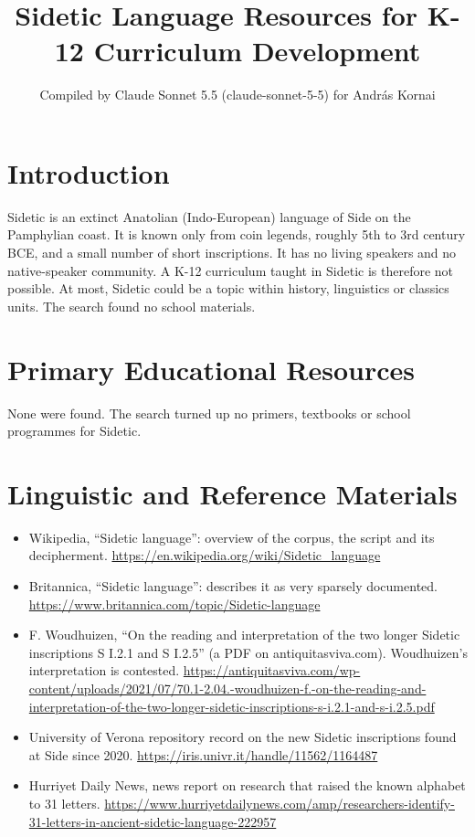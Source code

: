 \documentclass[12pt]{article}
\title{Sidetic Language Resources for K-12 Curriculum Development}
\author{Compiled by Claude Sonnet 5.5 (claude-sonnet-5-5) for Andr\'as Kornai}
\date{}
\begin{document}
\maketitle

\section{Introduction}
Sidetic is an extinct Anatolian (Indo-European) language of Side on the Pamphylian coast. It is known only from coin legends, roughly 5th to 3rd century BCE, and a small number of short inscriptions. It has no living speakers and no native-speaker community. A K-12 curriculum taught in Sidetic is therefore not possible. At most, Sidetic could be a topic within history, linguistics or classics units. The search found no school materials.

\section{Primary Educational Resources}
None were found. The search turned up no primers, textbooks or school programmes for Sidetic.

\section{Linguistic and Reference Materials}
\begin{itemize}
\item Wikipedia, ``Sidetic language'': overview of the corpus, the script and its decipherment. \url{https://en.wikipedia.org/wiki/Sidetic_language}
\item Britannica, ``Sidetic language'': describes it as very sparsely documented. \url{https://www.britannica.com/topic/Sidetic-language}
\item F. Woudhuizen, ``On the reading and interpretation of the two longer Sidetic inscriptions S I.2.1 and S I.2.5'' (a PDF on antiquitasviva.com). Woudhuizen's interpretation is contested. \url{https://antiquitasviva.com/wp-content/uploads/2021/07/70.1-2.04.-woudhuizen-f.-on-the-reading-and-interpretation-of-the-two-longer-sidetic-inscriptions-s-i.2.1-and-s-i.2.5.pdf}
\item University of Verona repository record on the new Sidetic inscriptions found at Side since 2020. \url{https://iris.univr.it/handle/11562/1164487}
\item Hurriyet Daily News, news report on research that raised the known alphabet to 31 letters. \url{https://www.hurriyetdailynews.com/amp/researchers-identify-31-letters-in-ancient-sidetic-language-222957}
\end{itemize}
\end{document}

